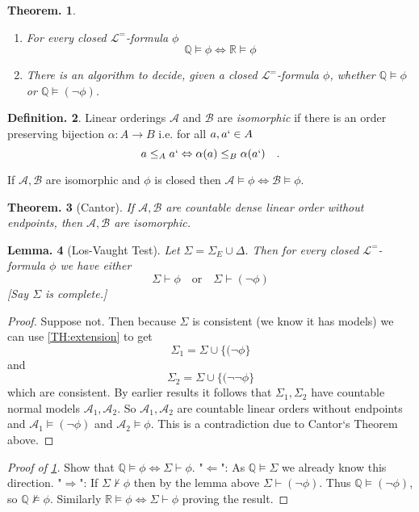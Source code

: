 \documentclass[a4paper,oneside,11pt,DIV=12,parskip=half]{scrartcl}
\newcommand{\R}{\mathbb R}
\newcommand{\LL}{\mathcal L}
\newcommand{\A}{\mathcal A}
\theoremstyle{plain}
\newtheorem{theorem}{Theorem.}[section]
\newtheorem{lemma}[theorem]{Lemma.}
\theoremstyle{definition}
\newtheorem{definition}[theorem]{Definition.}
\newtheorem{remark, definition}[theorem]{Remark and Definition.}
\newtheorem{lemma, definition}[theorem]{Lemma and Definition.}
\newtheorem{theorem, definition}[theorem]{Theorem and Definition.}
\theoremstyle{remark}
\newtheorem*{remark, example}{\textbf{Remark and Exercise}}
\begin{document}
\begin{theorem}\label{Th:QsimR}
\begin{enumerate}
    \item For every closed $\LL^=$-formula $\phi$
        \[ \mathbb{Q} \vDash \phi \Leftrightarrow \R \vDash \phi \]
    \item There is an algorithm to decide, given a closed $\LL^=$-formula $\phi$, whether $\mathbb{Q} \vDash \phi$ or $\mathbb{Q} \vDash (\lnot \phi)$.
\end{enumerate}
\end{theorem}

\begin{definition}
     Linear orderings $\A$ and $\mathcal{B}$ are \emph{isomorphic} if there is an order preserving bijection $\alpha: A \rightarrow B$ i.e. for all $a,a` \in A$
     \[ a \leq_A a` \Leftrightarrow \alpha(a) \leq_B \alpha(a`) \quad . \]
     
     If $\A, \mathcal{B}$ are isomorphic and $\phi$ is closed then $\A \vDash \phi \Leftrightarrow \mathcal{B} \vDash \phi$.
\end{definition}

\begin{theorem}[Cantor]
If $\A,\mathcal{B}$ are countable dense linear order without endpoints, then $\A,\mathcal{B}$ are isomorphic.
\end{theorem}

\begin{lemma}[Los-Vaught Test]
Let $\Sigma = \Sigma_E \cup \Delta$. Then for every closed $\LL^=$-formula $\phi$ we have either
    \[ \Sigma \vdash \phi \quad \text{or} \quad \Sigma \vdash (\lnot \phi) \]
[Say $\Sigma$ is complete.]
\end{lemma}

\begin{proof}
Suppose not. Then because $\Sigma$ is consistent (we know it has models) we can use \ref{TH:extension} to get 
\[ \Sigma_1 = \Sigma \cup \{ (\lnot \phi \} \] and
\[ \Sigma_2 = \Sigma \cup \{ (\lnot \lnot \phi \} \]
which are consistent.
By earlier results it follows that $\Sigma_1, \Sigma_2$ have countable normal models $\A_1,\A_2$. So $\A_1,\A_2$ are countable linear orders without endpoints and $\A_1 \vDash (\lnot \phi)$ and $\A_2 \vDash \phi$. This is a contradiction due to Cantor`s Theorem above.
\end{proof}

\begin{proof}[Proof of \ref{Th:QsimR}]
Show that $\mathbb{Q} \vDash \phi \Leftrightarrow \Sigma \vdash \phi$.
"$\Leftarrow$": As $\mathbb{Q} \vDash \Sigma$ we already know this direction.
"$\Rightarrow$": If $\Sigma \not \vdash \phi$ then by the lemma above $\Sigma \vdash (\lnot \phi)$. Thus $\mathbb{Q} \vDash (\lnot \phi)$, so $\mathbb{Q} \not \vDash \phi $.
Similarly $\R \vDash \phi \Leftrightarrow \Sigma \vdash \phi$ proving the result. 
\end{proof}
\end{document}
